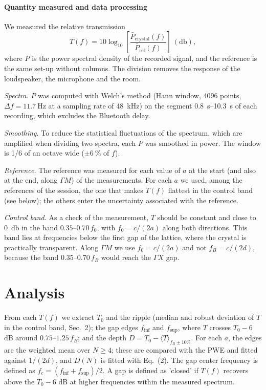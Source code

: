 \documentclass[9pt,a4paper,twocolumn]{extarticle}
\newcommand{\pbreak}{\par\vspace{3pt}}
\newcommand{\finf}{\ensuremath{f_{\mathrm{inf}}}}
\newcommand{\fsup}{\ensuremath{f_{\mathrm{sup}}}}
\begin{document}
\paragraph{Quantity measured and data processing}
We measured the relative transmission
\begin{equation}
  T(f) = 10\log_{10}\!\left[\frac{\bar P_{\mathrm{crystal}}(f)}{\bar P_{\mathrm{ref}}(f)}\right]\ (\si{\decibel}),
\end{equation}
where $P$ is the power spectral density of the recorded signal, and the reference is the same set-up without columns. The division removes the response of the loudspeaker, the microphone and the room.
\pbreak
\emph{Spectra.} $P$ was computed with Welch's method \cite{heinzel} (Hann window, 4096 points, $\Delta f = \SI{11.7}{\hertz}$ at a sampling rate of \SI{48}{\kilo\hertz}) on the segment \SIrange{0.8}{10.3}{\second} of each recording, which excludes the Bluetooth delay.
\pbreak
\emph{Smoothing.} To reduce the statistical fluctuations of the spectrum, which are amplified when dividing two spectra, each $P$ was smoothed in power. The window is 1/6 of an octave wide ($\pm\SI{6}{\percent}$ of $f$).
\pbreak
\emph{Reference.} The reference was measured for each value of $a$ at the start (and also at the end, along $\Gamma M$) of the measurements. For each $a$ we used, among the references of the session, the one that makes $T(f)$ flattest in the control band (see below); the others enter the uncertainty associated with the reference.

\emph{Control band.}
As a check of the measurement, $T$ should be constant and close to \SI{0}{\decibel} in the band $0.35$--$0.70\,f_0$, with $f_0 = c/(2a)$ along both directions. This band lies at frequencies below the first gap of the lattice, where the crystal is practically transparent. Along $\Gamma M$ we use $f_0 = c/(2a)$ and not $f_B = c/(2d)$, because the band $0.35$--$0.70\,f_B$ would reach the $\Gamma X$ gap.

\section{Analysis}
From each $T(f)$ we extract $T_0$ and the ripple (median and robust deviation of $T$ in the control
band, Sec.~2); the gap edges \finf{} and \fsup{}, where $T$ crosses $T_0-6$\,dB around $0.75$--$1.25\,f_B$; and the depth $D=T_0-\langle T\rangle_{f_B\pm10\%}$. For each $a$, the edges
are the weighted mean over $N\ge4$; these are
compared with the PWE and fitted against $1/(2d)$, and $D(N)$ is fitted with Eq.~(2). The gap center frequency is defined as $f_c = (f_{\text{inf}} + f_{\text{sup}})/2$. A gap is defined as 'closed' if $T(f)$ recovers above the  $T_0 - 6\text{ dB}$ at higher frequencies within the measured spectrum.
\end{document}
